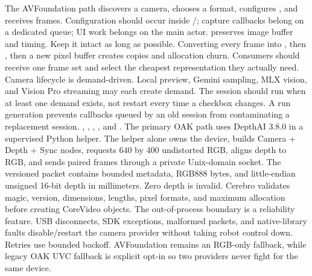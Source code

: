 {}The AVFoundation path discovers a camera, chooses a format, configures , and receives  frames. Configuration should occur inside /; capture callbacks belong on a dedicated queue; UI work belongs on the main actor.\markdownRendererParagraphSeparator
{} preserves image buffer and timing. Keep it intact as long as possible. Converting every frame into , then , then a new pixel buffer creates copies and allocation churn. Consumers should receive one frame set and select the cheapest representation they actually need.\markdownRendererParagraphSeparator
{}Camera lifecycle is demand-driven. Local preview, Gemini sampling, MLX vision, and Vision Pro streaming may each create demand. The session should run when at least one demand exists, not restart every time a checkbox changes. A run generation prevents callbacks queued by an old session from contaminating a replacement session.\markdownRendererInterblockSeparator
{}
\markdownRendererSectionEnd \markdownRendererSectionBegin
{}\markdownRendererInterblockSeparator
{}\markdownRendererBlockQuoteBegin
{} , , , , and .\markdownRendererBlockQuoteEnd \markdownRendererInterblockSeparator
{}The primary OAK path uses DepthAI 3.8.0 in a supervised Python helper. The helper alone owns the device, builds Camera + Depth + Sync nodes, requests 640 by 400 undistorted RGB, aligns depth to RGB, and sends paired frames through a private Unix-domain socket.\markdownRendererParagraphSeparator
{}The versioned  packet contains bounded metadata, RGB888 bytes, and little-endian unsigned 16-bit depth in millimeters. Zero depth is invalid. Cerebro validates magic, version, dimensions, lengths, pixel formats, and maximum allocation before creating CoreVideo objects.\markdownRendererParagraphSeparator
{}The out-of-process boundary is a reliability feature. USB disconnects, SDK exceptions, malformed packets, and native-library faults disable/restart the camera provider without taking robot control down. Retries use bounded backoff. AVFoundation remains an RGB-only fallback, while legacy OAK UVC fallback is explicit opt-in so two providers never fight for the same device.\markdownRendererInterblockSeparator
